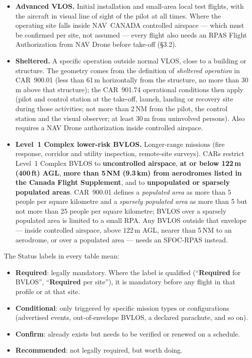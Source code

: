 \documentclass[11pt,letterpaper]{article}
\newcommand{\req}{\textbf{\color{uavwarn!85!black}Required}}
\newcommand{\cond}{\textbf{\color{uavblue}Conditional}}
\newcommand{\confirm}{\textbf{\color{uavgood!80!black}Confirm}}
\newcommand{\rec}{\textbf{\color{uavgrey!75!black}Recommended}}
\begin{document}
\begin{itemize}[leftmargin=1.4em, itemsep=2pt, topsep=2pt]
  \item \textbf{Advanced VLOS.} Initial installation and small-area
        local test flights, with the aircraft in visual line of sight of
        the pilot at all times. Where the operating site falls inside
        NAV~CANADA controlled airspace --- which must be confirmed per
        site, not assumed --- every flight also needs an RPAS Flight
        Authorization from NAV Drone before take-off (\S3.2).
  \item \textbf{Sheltered.} A specific operation outside normal VLOS,
        close to a building or structure. The geometry comes from the
        definition of \emph{sheltered operation} in CAR~900.01 (less
        than 61\,m horizontally from the structure, no more than 30\,m
        above that structure); the CAR~901.74 operational conditions
        then apply (pilot and control station at the take-off, launch,
        landing or recovery site during those activities; not more than
        2\,NM from the pilot, the control station and the visual
        observer; at least 30\,m from uninvolved persons). Also requires
        a NAV Drone authorization inside controlled airspace.
  \item \textbf{Level~1 Complex lower-risk BVLOS.} Longer-range missions
        (fire response, corridor and utility inspection, remote-site
        surveys). CARs restrict Level~1 Complex BVLOS to
        \textbf{uncontrolled airspace}, \textbf{at or below 122\,m
        (400\,ft) AGL}, \textbf{more than 5\,NM (9.3\,km) from
        aerodromes listed in the Canada Flight Supplement}, and to
        \textbf{unpopulated or sparsely populated areas}. CAR~900.01
        defines a \emph{populated area} as more than 5 people per square
        kilometre and a \emph{sparsely populated area} as more than 5
        but not more than 25 people per square kilometre; BVLOS over a
        sparsely populated area is limited to a small RPA. Any BVLOS
        outside that envelope --- inside controlled airspace, above
        122\,m AGL, nearer than 5\,NM to an aerodrome, or over a
        populated area --- needs an SFOC-RPAS instead.
\end{itemize}

The Status labels in every table mean:
\begin{itemize}[leftmargin=1.4em, itemsep=1pt, topsep=2pt]
  \item \req{}: legally mandatory. Where the label is qualified
        (``\req{} for BVLOS'', ``\req{} per site''), it is mandatory
        before any flight in that profile or at that site.
  \item \cond{}: only triggered by specific mission types or
        configurations (advertised events, out-of-envelope BVLOS, a
        declared parachute, and so on).
  \item \confirm{}: already exists but needs to be verified or renewed
        on a schedule.
  \item \rec{}: not legally required, but worth doing.
\end{itemize}
\end{document}
